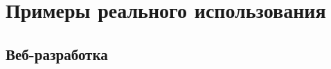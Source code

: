 \section{Примеры реального использования}\label{common-lisp:introduction:examples}
\subsection{Веб-разработка}\label{common-lisp:introduction:examples:web}
